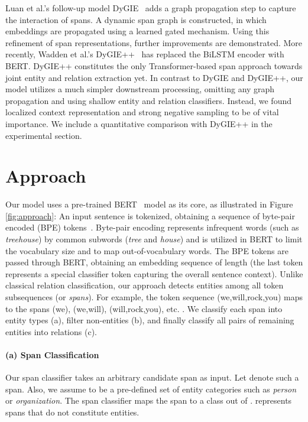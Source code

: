 \documentclass{ecai}
\begin{document}
Luan et al.'s follow-up model DyGIE~\cite{luan:2019:span_graphs} adds a graph propagation step to capture the interaction of spans. A dynamic span graph is constructed, in which embeddings are propagated using a learned gated mechanism. Using this refinement of span representations, further improvements are demonstrated.
More recently, Wadden et al.'s DyGIE++~\cite{wadden:2019:dygie++} has replaced the BiLSTM encoder with BERT. DyGIE++ constitutes the only Transformer-based span approach towards joint entity and relation extraction yet.
In contrast to DyGIE and DyGIE++, our model utilizes a much simpler downstream processing, omitting any graph propagation and using shallow entity and relation classifiers. Instead, we found localized context representation and strong negative sampling to be of vital importance. We include a quantitative comparison with DyGIE++ in the experimental section.











    





\section{Approach}


Our model uses a pre-trained BERT~\cite{devlin:2018:bert} model as its core, as illustrated in Figure \ref{fig:approach}: 
An input sentence is tokenized, obtaining a sequence of  byte-pair encoded (BPE) tokens~\cite{sennrich:2016:bpe}. Byte-pair encoding represents infrequent words (such as {\it treehouse}) by common subwords ({\it tree} and {\it house}) and is utilized in BERT to limit the vocabulary size and to map out-of-vocabulary words.
The BPE tokens are passed through BERT, obtaining an embedding sequence  of length  (the last token  represents a special classifier token capturing the overall sentence context). Unlike classical relation classification, our approach detects entities among all token subsequences (or {\it spans}). For example, the token sequence (we,will,rock,you) maps to the spans (we), (we,will), (will,rock,you), etc. . 
We classify each span into entity types (a), filter non-entities (b), and finally classify all pairs of remaining entities into relations (c). 

\paragraph{(a) Span Classification} Our span classifier takes an arbitrary candidate span as input. Let  denote such a span.  Also, we assume  to be a pre-defined set of entity categories such as {\it person} or {\it organization}. The span classifier maps the span  to a class out of .  represents spans that do not constitute entities. 
\end{document}
